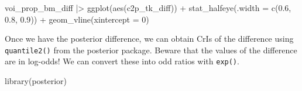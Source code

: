 \documentclass[
  authoryear,
  preprint,
  3p]{elsarticle}
\newenvironment{Shaded}{\begin{snugshade}}{\end{snugshade}}
\newcommand{\AttributeTok}[1]{\textcolor[rgb]{0.40,0.45,0.13}{#1}}
\newcommand{\DecValTok}[1]{\textcolor[rgb]{0.68,0.00,0.00}{#1}}
\newcommand{\FloatTok}[1]{\textcolor[rgb]{0.68,0.00,0.00}{#1}}
\newcommand{\FunctionTok}[1]{\textcolor[rgb]{0.28,0.35,0.67}{#1}}
\newcommand{\NormalTok}[1]{\textcolor[rgb]{0.00,0.23,0.31}{#1}}
\newcommand{\SpecialCharTok}[1]{\textcolor[rgb]{0.37,0.37,0.37}{#1}}
\begin{document}
\begin{Shaded}
\begin{Highlighting}[]
\NormalTok{voi\_prop\_bm\_diff }\SpecialCharTok{|\textgreater{}} 
  \FunctionTok{ggplot}\NormalTok{(}\FunctionTok{aes}\NormalTok{(c2p\_tk\_diff)) }\SpecialCharTok{+}
  \FunctionTok{stat\_halfeye}\NormalTok{(}\AttributeTok{.width =} \FunctionTok{c}\NormalTok{(}\FloatTok{0.6}\NormalTok{, }\FloatTok{0.8}\NormalTok{, }\FloatTok{0.9}\NormalTok{)) }\SpecialCharTok{+}
  \FunctionTok{geom\_vline}\NormalTok{(}\AttributeTok{xintercept =} \DecValTok{0}\NormalTok{)}
\end{Highlighting}
\end{Shaded}

\begin{figure}[H]


\caption{\label{fig-diff-p-tk}}

\end{figure}%

Once we have the posterior difference, we can obtain CrIs of the
difference using \texttt{quantile2()} from the posterior package. Beware
that the values of the difference are in log-odds! We can convert these
into odd ratios with \texttt{exp()}.

\begin{Shaded}
\begin{Highlighting}[]
\FunctionTok{library}\NormalTok{(posterior)}
\end{Highlighting}
\end{Shaded}
\end{document}
